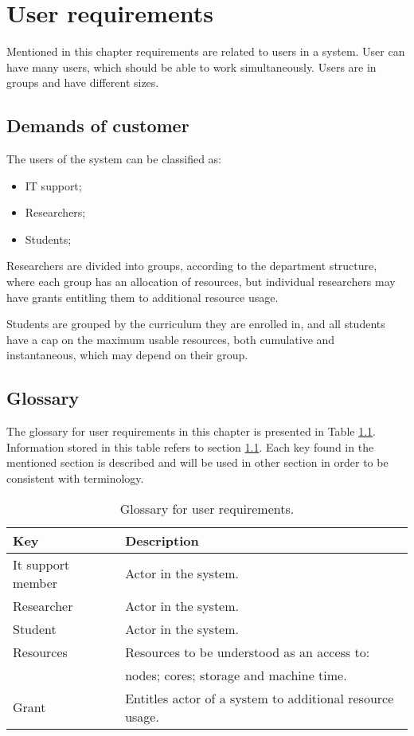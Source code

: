 \chapter{User requirements} \label{sec:user_requirements}
	Mentioned in this chapter requirements are related to users in a system. User can have many users, which should be able to work simultaneously. Users are in groups and have different sizes.
	
	\section{Demands of customer}
	\label{sec:user_requirements_demands}
		The users of the system can be classified as:
		\begin{itemize}
			\item IT support;
			\item Researchers;
			\item Students;
		\end{itemize}
		Researchers are divided into groups, according to the department structure, where each group has an allocation of resources, but individual researchers may have grants entitling them to additional resource usage.
		
		Students are grouped by the curriculum they are enrolled in, and all students have a cap on the maximum usable resources, both cumulative and instantaneous, which may depend on their group.
	
	\section{Glossary} 
	\label{sec:user_requirements_glossary}
		The glossary for user requirements in this chapter is presented in Table \ref{tab:user_requirements_glossary}. Information stored in this table refers to section \ref{sec:user_requirements_demands}. Each key found in the mentioned section is described and will be used in other section in order to be consistent with terminology.
		\begin{table}[!htbp]
			\centering
			\caption{Glossary for user requirements.}
			\label{tab:user_requirements_glossary}
			\begin{tabular}{|l|l|}
				\hline
				\textbf{Key} & \textbf{Description} \\ \hline \hline
				It support member & Actor in the system. \\ \hline
				Researcher & Actor in the system. \\ \hline
				Student & Actor in the system. \\ \hline
				Resources & Resources to be understood as an access to:\\& nodes; cores; storage and machine time.\\ \hline
				Grant & Entitles actor of a system to additional resource usage. \\ \hline
			\end{tabular}
		\end{table}
	

